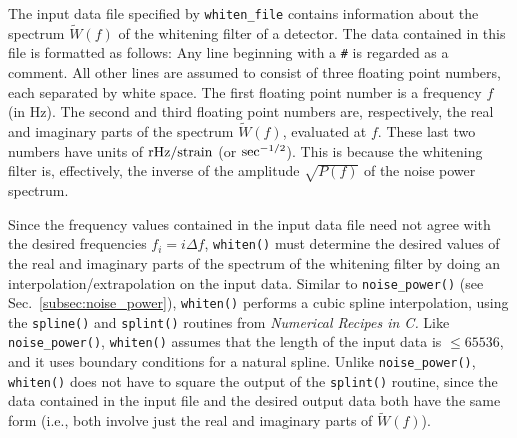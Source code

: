 The input data file specified by {\tt whiten\_file} contains information 
about the spectrum $\tilde W(f)$ of the whitening filter of a detector.
The data contained in this file is formatted as follows:
Any line beginning with a {\tt \#} is regarded as a comment.
All other lines are assumed to consist of three floating point numbers,
each separated by white space.
The first floating point number is a frequency $f$ (in Hz).
The second and third floating point numbers are, respectively, the real 
and imaginary parts of the spectrum $\tilde W(f)$, evaluated at $f$.
These last two numbers have units of ${\rm rHz}/{\rm strain}$ 
(or ${\rm sec}^{-1/2}$).
This is because the whitening filter is, effectively, the inverse of 
the amplitude $\sqrt{P(f)}$ of the noise power spectrum.

Since the frequency values contained in the input data file need not 
agree with the desired frequencies $f_i=i\Delta f$, {\tt whiten()} 
must determine the desired values of the real and imaginary parts of the 
spectrum of the whitening filter by doing an
interpolation/extrapolation on the input data.
Similar to {\tt noise\_power()} (see Sec.~\ref{subsec:noise_power}), 
{\tt whiten()} performs a cubic spline interpolation, 
using the {\tt spline()} and {\tt splint()} routines from
{\it Numerical Recipes in C.}
Like {\tt noise\_power()}, {\tt whiten()} assumes that the length of 
the input data is $\le 65536$, and it uses boundary conditions for a 
natural spline.
Unlike {\tt noise\_power()}, {\tt whiten()} does not 
have to square the output of the {\tt splint()}
routine, since the data contained in the input file and the desired
output data both have the same form (i.e., both involve just the real 
and imaginary parts of $\tilde W(f)$).
%
